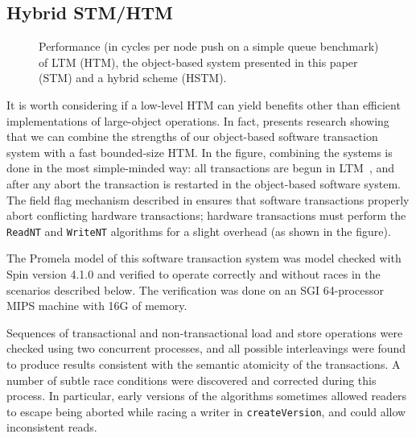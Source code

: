 \documentclass{csa-sig-alternate}
\begin{document}
\subsection{Hybrid STM/HTM}\label{sec:hybrid}
\begin{figure}\centering
{}
\caption{Performance (in cycles per node push on a simple queue
  benchmark) of LTM (HTM), the
  object-based system presented in this paper (STM) and a hybrid
  scheme (HSTM).}%
\label{fig:hybrid}%
\end{figure}
It is worth considering if a low-level HTM can yield benefits other
than efficient implementations of large-object operations.  In fact,
 presents research showing that we can combine the
strengths of our object-based software transaction system with a
fast bounded-size HTM.  In the figure, combining the systems is done
in the most simple-minded way: all transactions are begun in
LTM~\cite{AnanianAsKuLeLi04},
and after any abort the transaction is restarted in the
object-based software system.  The field flag mechanism described in
 ensures that software transactions properly abort
conflicting hardware transactions; hardware transactions must perform
the \texttt{ReadNT} and \texttt{WriteNT} algorithms for a slight
overhead (as shown in the figure).

The Promela model of this software transaction system was model
checked with Spin version 4.1.0 and verified to operate correctly and
without races in the scenarios described below.  The verification was
done on an SGI 64-processor MIPS machine with 16G of memory.

Sequences of transactional and non-transactional load and store
operations were checked using two concurrent processes,
and all possible
interleavings were found to produce results consistent with
the semantic atomicity of the transactions.  A number of subtle race
conditions were discovered and corrected during this process.
In particular, early versions of the algorithms sometimes allowed
readers to escape being aborted while racing a writer in
\texttt{createVersion}, and could allow inconsistent reads.
\end{document}
